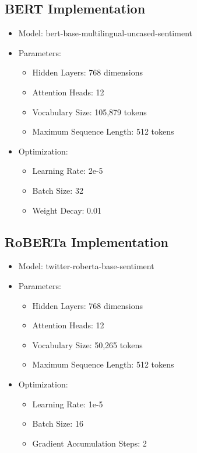\documentclass[12pt,a4paper]{report}
\begin{document}
\subsection{BERT Implementation}
\begin{itemize}
    \item Model: bert-base-multilingual-uncased-sentiment
    \item Parameters:
        \begin{itemize}
            \item Hidden Layers: 768 dimensions
            \item Attention Heads: 12
            \item Vocabulary Size: 105,879 tokens
            \item Maximum Sequence Length: 512 tokens
        \end{itemize}
    \item Optimization:
        \begin{itemize}
            \item Learning Rate: 2e-5
            \item Batch Size: 32
            \item Weight Decay: 0.01
        \end{itemize}
\end{itemize}

\subsection{RoBERTa Implementation}
\begin{itemize}
    \item Model: twitter-roberta-base-sentiment
    \item Parameters:
        \begin{itemize}
            \item Hidden Layers: 768 dimensions
            \item Attention Heads: 12
            \item Vocabulary Size: 50,265 tokens
            \item Maximum Sequence Length: 512 tokens
        \end{itemize}
    \item Optimization:
        \begin{itemize}
            \item Learning Rate: 1e-5
            \item Batch Size: 16
            \item Gradient Accumulation Steps: 2
        \end{itemize}
\end{itemize}
\end{document}
